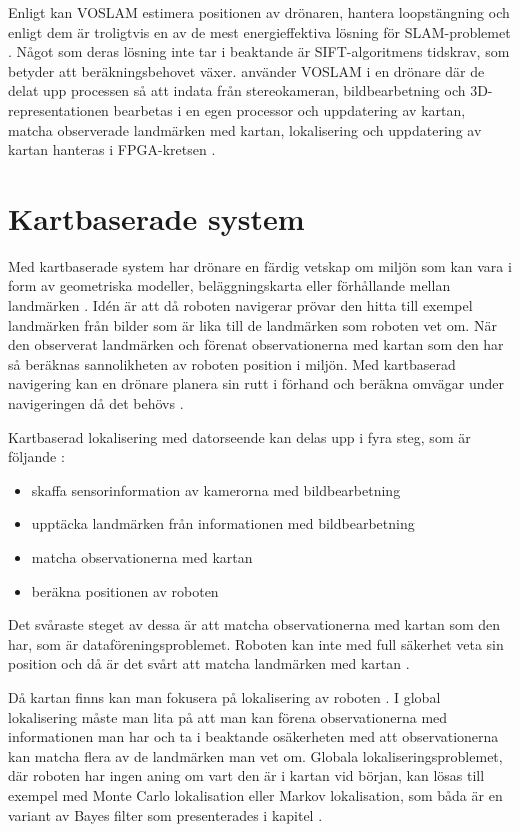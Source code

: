 Enligt \cite{voslam} kan VOSLAM estimera positionen av drönaren, hantera loopstängning och enligt dem är troligtvis en av de mest energieffektiva lösning för SLAM-problemet \citep{voslam}. Något som deras lösning inte tar i beaktande är SIFT-algoritmens tidskrav, som betyder att beräkningsbehovet växer. \cite{voslamlatif} använder VOSLAM i en drönare där de delat upp processen så att indata från stereokameran, bildbearbetning och 3D-representationen bearbetas i en egen processor och uppdatering av kartan, matcha observerade landmärken med kartan, lokalisering och uppdatering av kartan hanteras i FPGA-kretsen \citep{voslamlatif}. 

\section{Kartbaserade system}

Med kartbaserade system har drönare en färdig vetskap om miljön som kan vara i form av geometriska modeller, beläggningskarta eller förhållande mellan landmärken \citep{982903}. Idén är att då roboten navigerar prövar den hitta till exempel landmärken från bilder som är lika till de landmärken som roboten vet om. När den observerat landmärken och förenat observationerna med kartan som den har så beräknas sannolikheten av roboten position i miljön. Med kartbaserad navigering kan en drönare planera sin rutt i förhand och beräkna omvägar under navigeringen då det behövs \citep{geospatial}. 

Kartbaserad lokalisering med datorseende kan delas upp i fyra steg, som är följande \citep{982903}:

\begin{itemize}
    \item skaffa sensorinformation av kamerorna med bildbearbetning
    \item upptäcka landmärken från informationen med bildbearbetning
    \item matcha observationerna med kartan
    \item beräkna positionen av roboten
\end{itemize}

Det svåraste steget av dessa är att matcha observationerna med kartan som den har, som är dataföreningsproblemet. Roboten kan inte med full säkerhet veta sin position och då är det svårt att matcha landmärken med kartan \citep{982903}.

Då kartan finns kan man fokusera på lokalisering av roboten \citep{982903}. I global lokalisering måste man lita på att man kan förena observationerna med informationen man har och ta i beaktande osäkerheten med att observationerna kan matcha flera av de landmärken man vet om. Globala lokaliseringsproblemet, där roboten har ingen aning om vart den är i kartan vid början, kan lösas till exempel med Monte Carlo lokalisation eller Markov lokalisation, som båda är en variant av Bayes filter som presenterades i kapitel  \citep{ProbabilisticRobotics}. 

